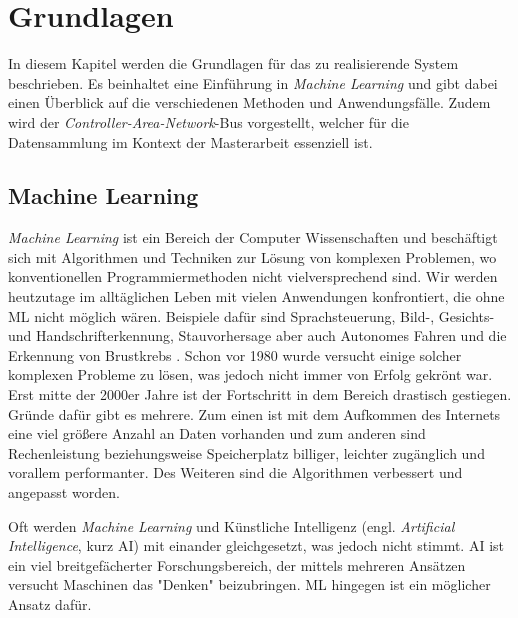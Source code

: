 %
%
%
%
%


\chapter{Grundlagen}
\label{chap:state_of_the_art}

In diesem Kapitel werden die Grundlagen für das zu realisierende System beschrieben. Es beinhaltet eine Einführung in \textit{Machine Learning} und gibt dabei einen Überblick auf die verschiedenen Methoden und Anwendungsfälle. Zudem wird der \textit{Controller-Area-Network}-Bus vorgestellt, welcher für die Datensammlung im Kontext der Masterarbeit essenziell ist.

\section{Machine Learning}
\label{sec:machine_learning}

\textit{Machine Learning} ist ein Bereich der Computer Wissenschaften und beschäftigt sich mit Algorithmen und Techniken zur Lösung von komplexen Problemen, wo konventionellen Programmiermethoden nicht vielversprechend sind. Wir werden heutzutage im alltäglichen Leben mit vielen Anwendungen konfrontiert, die ohne ML nicht möglich wären. Beispiele dafür sind Sprachsteuerung, Bild-, Gesichts- und Handschrifterkennung, Stauvorhersage aber auch Autonomes Fahren und die Erkennung von Brustkrebs \cite{KOUROU20158}. Schon vor 1980 wurde versucht einige solcher komplexen Probleme zu lösen, was jedoch nicht immer von Erfolg gekrönt war. Erst mitte der 2000er Jahre ist der Fortschritt in dem Bereich drastisch gestiegen. Gründe dafür gibt es mehrere. Zum einen ist mit dem Aufkommen des Internets eine viel größere Anzahl an Daten vorhanden und zum anderen sind Rechenleistung beziehungsweise Speicherplatz billiger, leichter zugänglich und vorallem performanter. Des Weiteren sind die Algorithmen verbessert und angepasst worden.

Oft werden \textit{Machine Learning} und Künstliche Intelligenz (engl. \textit{Artificial Intelligence}, kurz AI) mit einander gleichgesetzt, was jedoch nicht stimmt. AI ist ein viel breitgefächerter Forschungsbereich, der mittels mehreren Ansätzen versucht Maschinen das "Denken" beizubringen. ML hingegen ist ein möglicher Ansatz dafür.

